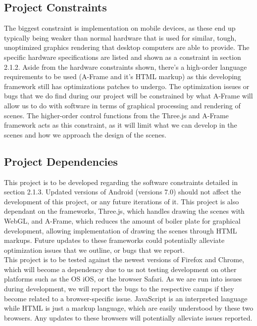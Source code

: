 \documentclass[letterpaper,10pt,draftclsnofoot,onecolumn,compsoc]{IEEEtran}
\begin{document}
\subsection{Project Constraints}
\begin{singlespace}
\noindent
The biggest constraint is implementation on mobile devices, as these end up typically being weaker than normal hardware that is used for similar, tough, unoptimized graphics rendering that desktop computers are able to provide. The specific hardware specifications are listed and shown as a constraint in section 2.1.2. Aside from the hardware constraints shown, there's a high-order language requirements to be used (A-Frame and it's HTML markup) as this developing framework still has optimizations patches to undergo. The optimization issues or bugs that we do find during our project will be constrained by what A-Frame will allow us to do with software in terms of graphical processing and rendering of scenes. The higher-order control functions from the Three.js and A-Frame framework acts as this constraint, as it will limit what we can develop in the scenes and how we approach the design of the scenes.
\end{singlespace}

\subsection{Project Dependencies}
\begin{singlespace}
\noindent
This project is to be developed regarding the software constraints detailed in section 2.1.3. Updated versions of Android (versions  7.0) should not affect the development of this project, or any future iterations of it. This project is also dependant on the frameworks, Three.js, which handles drawing the scenes with WebGL, and A-Frame, which reduces the amount of boiler plate for graphical development, allowing implementation of drawing the scenes through HTML markups. Future updates to these frameworks could potentially alleviate optimization issues that we outline, or bugs that we report. \\

\noindent
This project is to be tested against the newest versions of Firefox and Chrome, which will become a dependency due to us not testing development on other platforms such as the OS iOS, or the browser Safari. As we are run into issues during development, we will report the bugs to the respective camps if they become related to a browser-specific issue. JavaScript is an interpreted language while HTML is just a markup language, which are easily understood by these two browsers. Any updates to these browsers will potentially alleviate issues reported.
\end{singlespace}
\end{document}
